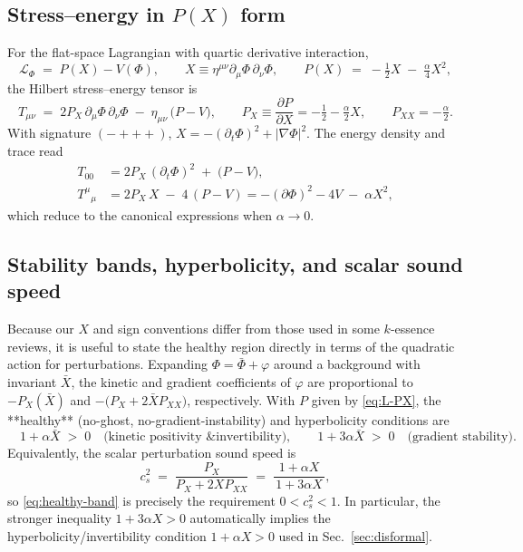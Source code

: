 \documentclass{article}
\begin{document}
\subsection{Stress--energy in \texorpdfstring{$P(X)$}{P(X)} form}
\label{sec:stressPX}

For the flat-space Lagrangian with quartic derivative interaction,
\begin{equation}
\mathcal{L}_\Phi \;=\; P(X) - V(\Phi),
\qquad
X \equiv \eta^{\mu\nu}\partial_\mu\Phi\,\partial_\nu\Phi,
\qquad
P(X) \;=\; -\tfrac12 X \;-\; \tfrac{\alpha}{4}X^2,
\label{eq:L-PX}
\end{equation}
the Hilbert stress--energy tensor is
\begin{equation}
T_{\mu\nu} \;=\; 2P_X\,\partial_\mu\Phi\,\partial_\nu\Phi \;-\; \eta_{\mu\nu}\,\big(P - V\big),
\qquad
P_X \equiv \frac{\partial P}{\partial X} = -\tfrac12 - \tfrac{\alpha}{2}X,
\qquad
P_{XX} = -\tfrac{\alpha}{2}.
\label{eq:Tmunu-PX}
\end{equation}
With signature $(-+++)$, $X=-(\partial_t\Phi)^2+|\nabla\Phi|^2$. The energy density and trace read
\begin{align}
T_{00} &= 2P_X\,(\partial_t\Phi)^2 \;+\; \big(P - V\big), \label{eq:T00-PX}\\
T^\mu{}_\mu &= 2P_X\,X \;-\; 4\,(P - V)
= -(\partial\Phi)^2 - 4V \;-\; \alpha X^2, \label{eq:trace-PX}
\end{align}
which reduce to the canonical expressions when $\alpha\to 0$.

\subsection{Stability bands, hyperbolicity, and scalar sound speed}
\label{sec:stability-bands}

Because our $X$ and sign conventions differ from those used in some $k$-essence reviews, it is useful to state the healthy region directly in terms of the quadratic action for perturbations. Expanding $\Phi=\bar\Phi+\varphi$ around a background with invariant $\bar X$, the kinetic and gradient coefficients of $\varphi$ are proportional to $-P_X(\bar X)$ and $-\big(P_X+2\bar X P_{XX}\big)$, respectively. With $P$ given by \eqref{eq:L-PX}, the **healthy** (no-ghost, no-gradient-instability) and hyperbolicity conditions are
\begin{equation}
\boxed{\quad
1+\alpha \bar X \;>\; 0 \quad \text{(kinetic positivity \& invertibility)}, \qquad
1+3\alpha \bar X \;>\; 0 \quad \text{(gradient stability)}.
\quad}
\label{eq:healthy-band}
\end{equation}
Equivalently, the scalar perturbation sound speed is
\begin{equation}
c_s^2 \;=\; \frac{P_X}{P_X+2 X P_{XX}}
\;=\; \frac{1+\alpha X}{\,1+3\alpha X\,},
\label{eq:cs2}
\end{equation}
so \eqref{eq:healthy-band} is precisely the requirement $0<c_s^2<1$. In particular, the stronger inequality $1+3\alpha X>0$ automatically implies the hyperbolicity/invertibility condition $1+\alpha X>0$ used in Sec.~\ref{sec:disformal}.
\end{document}
